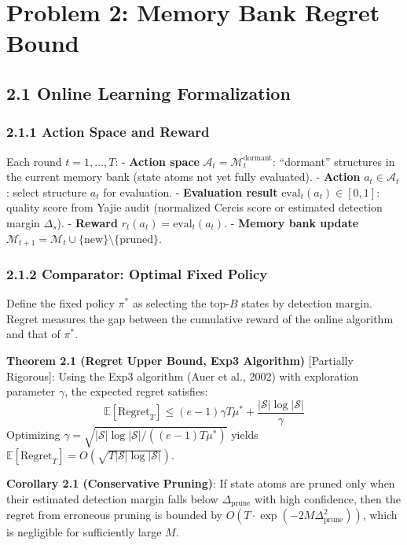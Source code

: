 \documentclass[
  12pt,
]{article}
\begin{document}
\section{Problem 2: Memory Bank Regret Bound}\label{problem-2-memory-bank-regret}

\subsection{2.1 Online Learning Formalization}\label{online-learning-formalization}

\subsubsection{2.1.1 Action Space and Reward}\label{action-space-reward}

Each round $t = 1, \ldots, T$:
- \textbf{Action space} $\mathcal{A}_t = \mathcal{M}_t^{\text{dormant}}$: ``dormant'' structures in the current memory bank (state atoms not yet fully evaluated).
- \textbf{Action} $a_t \in \mathcal{A}_t$: select structure $a_t$ for evaluation.
- \textbf{Evaluation result} $\text{eval}_t(a_t) \in [0, 1]$: quality score from Yajie audit (normalized Cercis score or estimated detection margin $\Delta_s$).
- \textbf{Reward} $r_t(a_t) = \text{eval}_t(a_t)$.
- \textbf{Memory bank update} $\mathcal{M}_{t+1} = \mathcal{M}_t \cup \{\text{new}\} \setminus \{\text{pruned}\}$.

\subsubsection{2.1.2 Comparator: Optimal Fixed Policy}\label{comparator-optimal-fixed}

Define the fixed policy $\pi^*$ as selecting the top-$B$ states by detection margin. Regret measures the gap between the cumulative reward of the online algorithm and that of $\pi^*$.

\textbf{Theorem 2.1 (Regret Upper Bound, Exp3 Algorithm)} [Partially Rigorous]: Using the Exp3 algorithm (Auer et al., 2002) with exploration parameter $\gamma$, the expected regret satisfies:
\[\boxed{\mathbb{E}[\text{Regret}_T] \leq (e-1)\gamma T \mu^* + \frac{|\mathcal{S}| \log |\mathcal{S}|}{\gamma}}\]
Optimizing $\gamma = \sqrt{|\mathcal{S}| \log |\mathcal{S}| / ((e-1)T \mu^*)}$ yields $\mathbb{E}[\text{Regret}_T] = O(\sqrt{T |\mathcal{S}| \log |\mathcal{S}|})$.

\textbf{Corollary 2.1 (Conservative Pruning)}: If state atoms are pruned only when their estimated detection margin falls below $\Delta_{\text{prune}}$ with high confidence, then the regret from erroneous pruning is bounded by $O(T \cdot \exp(-2M \Delta_{\text{prune}}^2))$, which is negligible for sufficiently large $M$.
\end{document}
